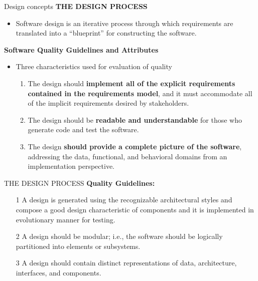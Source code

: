 \documentclass{beamer}
\begin{document}
\begin{frame}{Design concepts}
	\textbf{THE DESIGN PROCESS}
	\begin{itemize}
		\item Software design is an iterative process through which requirements are translated into a “blueprint” for constructing the software. 
	\end{itemize}
\textbf{Software Quality Guidelines and Attributes }
\begin{itemize}
	\item Three characteristics used for evaluation of quality
	\begin{enumerate}
		\item The design should \textbf{implement all of the explicit requirements contained in the 
			requirements model}, and it must accommodate all of the implicit requirements desired by 
		stakeholders.
		\item The design should be \textbf{readable and understandable} for those who generate code and test 
		the software.
		\item The design \textbf{should provide a complete picture of the software}, addressing the data, 
		functional, and behavioral domains from an implementation perspective.
	\end{enumerate}
\end{itemize}
\end{frame}
\begin{frame}{THE DESIGN PROCESS}
	\textbf{Quality Guidelines:}
	\begin{itemize}
		\item[1] A design is generated using the recognizable architectural styles and compose a good design characteristic of components and it is implemented in evolutionary manner for testing.
	
		\item[2] A design should be modular; i.e., the software should be logically partitioned into elements or 
		subsystems.
		\item[3] A design should contain distinct representations of data, architecture, interfaces, and 
		components.
	
	\end{itemize}
\end{frame}
\end{document}
